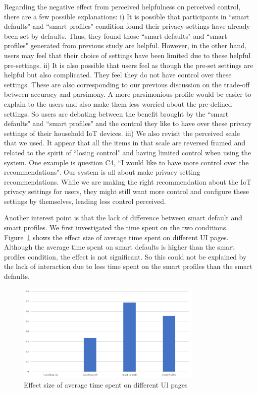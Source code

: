 Regarding the negative effect from perceived helpfulness on perceived control, there are a few possible explanations: i) It is possible that participants in ``smart defaults" and ``smart profiles" condition found their privacy-settings have already been set by defaults. Thus, they found those ``smart defaults" and ``smart profiles" generated from previous study are helpful. However, in the other hand, users may feel that their choice of settings have been limited due to these helpful pre-settings. ii) It is also possible that users feel as though the pre-set settings are helpful but also complicated. They feel they do not have control over these settings. These are also corresponding to our previous discussion on the trade-off between accuracy and parsimony. A more parsimonious profile would be easier to explain to the users and also make them less worried about the pre-defined settings. So users are debating between the benefit brought by the ``smart defaults" and ``smart profiles" and the control they like to have over these privacy settings of their household IoT devices.
iii) We also revisit the perceived scale that we used. It appear that all the items in that scale are reversed framed and related to the spirit of ``losing control" and having limited control when using the system. One example is question C4, ``I would like to have more control over the recommendations". Our system is all about make privacy setting recommendations. While we are making the right recommendation about the IoT privacy settings for users, they might still want more control and configure these settings by themselves, leading less control perceived.

Another interest point is that the lack of difference between smart default and smart profiles. We first investigated the time spent on the two conditions. Figure~\ref{fig:timeonui} shows the effect size of average time spent on different UI pages. Although the average time spent on smart defaults is higher than the smart profiles condition, the effect is not significant. So this could not be explained by the lack of interaction due to less time spent on the smart profiles than the smart defaults.

\begin{figure}
	\centering
	\includegraphics[width=0.8\textwidth]{figures/timeonui.png}
	\caption{Effect size of average time spent on different UI pages}
	\label{fig:timeonui}
\end{figure}

